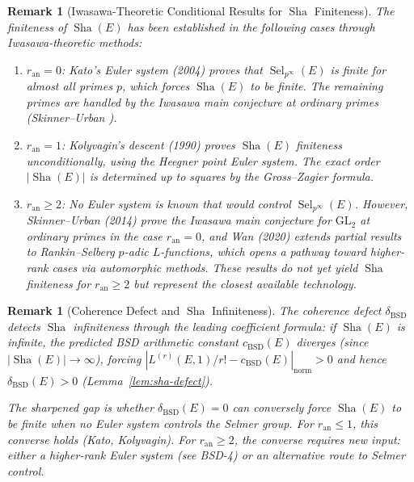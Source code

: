 \documentclass[11pt]{article}
\newtheorem{remark}[theorem]{Remark}
\DeclareMathOperator{\Sha}{Sha}
\DeclareMathOperator{\Sel}{Sel}
\begin{document}
\begin{remark}[Iwasawa-Theoretic Conditional Results for $\Sha$ Finiteness]
\label{rem:iwasawa-sha}
The finiteness of $\Sha(E)$ has been established in the following cases through
Iwasawa-theoretic methods:

\begin{enumerate}
  \item \textbf{$r_{\mathrm{an}} = 0$}: Kato's Euler system \cite{Kato}
    (2004) proves that $\Sel_{p^\infty}(E)$ is finite for almost all primes
    $p$, which forces $\Sha(E)$ to be finite.  The remaining primes are
    handled by the Iwasawa main conjecture at ordinary primes (Skinner--Urban
    \cite{SU}).

  \item \textbf{$r_{\mathrm{an}} = 1$}: Kolyvagin's descent \cite{Koly}
    (1990) proves $\Sha(E)$ finiteness unconditionally, using the Heegner
    point Euler system.  The exact order $|\Sha(E)|$ is determined up to
    squares by the Gross--Zagier formula.

  \item \textbf{$r_{\mathrm{an}} \geq 2$}: No Euler system is known that
    would control $\Sel_{p^\infty}(E)$.  However, Skinner--Urban \cite{SU}
    (2014) prove the Iwasawa main conjecture for $\mathrm{GL}_2$ at ordinary
    primes in the case $r_{\mathrm{an}} = 0$, and Wan \cite{Wan} (2020)
    extends partial results to Rankin--Selberg $p$-adic $L$-functions, which
    opens a pathway toward higher-rank cases via automorphic methods.  These
    results do not yet yield $\Sha$ finiteness for $r_{\mathrm{an}} \geq 2$
    but represent the closest available technology.
\end{enumerate}
\end{remark}

\begin{remark}[Coherence Defect and $\Sha$ Infiniteness]
\label{rem:delta-sha}
The coherence defect $\delta_{\mathrm{BSD}}$ detects $\Sha$ infiniteness
through the leading coefficient formula: if $\Sha(E)$ is infinite, the
predicted BSD arithmetic constant $c_{\mathrm{BSD}}(E)$ diverges (since
$|\Sha(E)| \to \infty$), forcing
$|L^{(r)}(E,1)/r! - c_{\mathrm{BSD}}(E)|_{\mathrm{norm}} > 0$ and hence
$\delta_{\mathrm{BSD}}(E) > 0$ (Lemma~\ref{lem:sha-defect}).

The sharpened gap is whether $\delta_{\mathrm{BSD}}(E) = 0$ can conversely
force $\Sha(E)$ to be finite when no Euler system controls the Selmer group.
For $r_{\mathrm{an}} \leq 1$, this converse holds (Kato, Kolyvagin).  For
$r_{\mathrm{an}} \geq 2$, the converse requires new input: either a
higher-rank Euler system (see BSD-4) or an alternative route to Selmer
control.
\end{remark}
\end{document}
